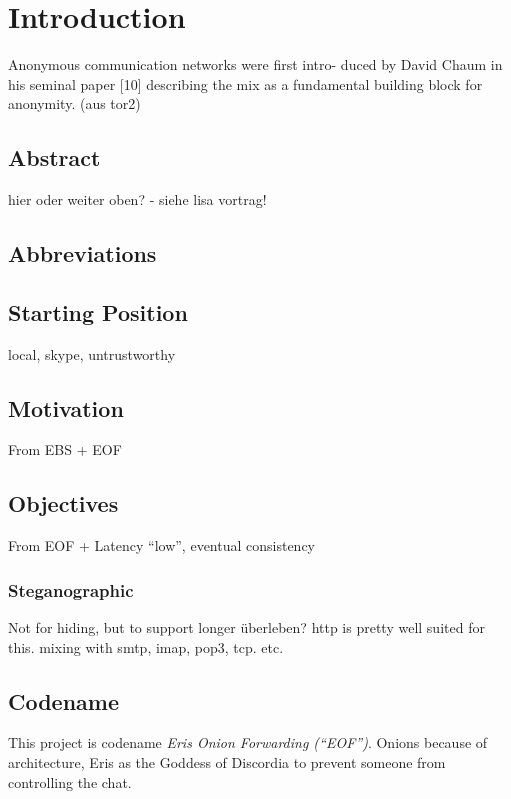 \chapter{Introduction}

Anonymous communication networks were first intro-
duced by David Chaum in his seminal paper [10] describing
the mix as a fundamental building block for anonymity.
(aus tor2)

\section{Abstract}
hier oder weiter oben? - siehe lisa vortrag!

\section{Abbreviations}
\section{Starting Position}
local, skype, untrustworthy

\section{Motivation}
From EBS + EOF

\section{Objectives}
From EOF + Latency "`low"', eventual consistency

\subsection{Steganographic}
Not for hiding, but to support longer überleben?
http is pretty well suited for this.
mixing with smtp, imap, pop3, tcp. etc.


\section{Codename}
This project is codename \textit{Eris Onion Forwarding ("`EOF"')}.
Onions because of architecture, Eris as the Goddess of Discordia to
prevent someone from controlling the chat.
